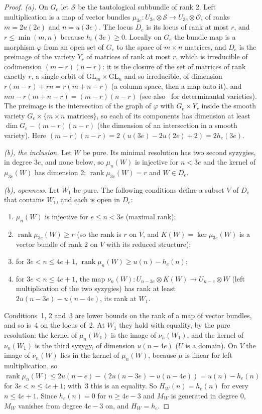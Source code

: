 \documentclass[11pt]{article}
\theoremstyle{definition}
\theoremstyle{remark}
\begin{document}
\begin{proof}
\emph{(a).} On $G_e$ let $\mathcal S$ be the tautological subbundle of rank $2$. Left multiplication is a map of vector bundles $\mu_{3e}:U_{2e}\otimes\mathcal S\to U_{3e}\otimes\mathcal O$, of ranks $m=2u(2e)$ and $n=u(3e)$. The locus $D_e$ is its locus of rank at most $r$, and $r\le\min(m,n)$ because $h_e(3e)\ge0$. Locally on $G_e$ the bundle map is a morphism $\varphi$ from an open set of $G_e$ to the space of $m\times n$ matrices, and $D_e$ is the preimage of the variety $Y_r$ of matrices of rank at most $r$, which is irreducible of codimension $(m-r)(n-r)$: it is the closure of the set of matrices of rank exactly $r$, a single orbit of $\mathrm{GL}_m\times\mathrm{GL}_n$ and so irreducible, of dimension $r(m-r)+rn=r(m+n-r)$ (a column space, then a map onto it), and $mn-r(m+n-r)=(m-r)(n-r)$ (see also~\cite{BV} for determinantal varieties). The preimage is the intersection of the graph of $\varphi$ with $G_e\times Y_r$ inside the smooth variety $G_e\times\{m\times n\text{ matrices}\}$, so each of its components has dimension at least $\dim G_e-(m-r)(n-r)$ (the dimension of an intersection in a smooth variety). Here $(m-r)(n-r)=2\,(u(3e)-2u(2e)+2)=2h_e(3e)$.

\emph{(b), the inclusion.} Let $W$ be pure. Its minimal resolution has two second syzygies, in degree $3e$, and none below, so $\mu_n(W)$ is injective for $n<3e$ and the kernel of $\mu_{3e}(W)$ has dimension $2$: $\operatorname{rank}\mu_{3e}(W)=r$ and $W\in D_e$.

\emph{(b), openness.} Let $W_1$ be pure. The following conditions define a subset $V$ of $D_e$ that contains $W_1$, and each is open in $D_e$:
\begin{enumerate}
\item $\mu_n(W)$ is injective for $e\le n<3e$ (maximal rank);
\item $\operatorname{rank}\mu_{3e}(W)\ge r$ (so the rank is $r$ on $V$, and $K(W)=\ker\mu_{3e}(W)$ is a vector bundle of rank $2$ on $V$ with its reduced structure);
\item for $3e<n\le4e+1$, $\operatorname{rank}\mu_n(W)\ge u(n)-h_e(n)$;
\item for $3e<n\le4e+1$, the map $\nu_n(W):U_{n-3e}\otimes K(W)\to U_{n-e}\otimes W$ (left multiplication of the two syzygies) has rank at least $2u(n-3e)-u(n-4e)$, its rank at $W_1$.
\end{enumerate}
Conditions~1, 2 and~3 are lower bounds on the rank of a map of vector bundles, and so is~4 on the locus of~2. At $W_1$ they hold with equality, by the pure resolution: the kernel of $\mu_n(W_1)$ is the image of $\nu_n(W_1)$, and the kernel of $\nu_n(W_1)$ is the third syzygy, of dimension $u(n-4e)$ ($U$ is a domain). On $V$ the image of $\nu_n(W)$ lies in the kernel of $\mu_n(W)$, because $\mu$ is linear for left multiplication, so $\operatorname{rank}\mu_n(W)\le2u(n-e)-(2u(n-3e)-u(n-4e))=u(n)-h_e(n)$ for $3e<n\le4e+1$; with~3 this is an equality. So $H_W(n)=h_e(n)$ for every $n\le4e+1$. Since $h_e(n)=0$ for $n\ge4e-3$ and $M_W$ is generated in degree $0$, $M_W$ vanishes from degree $4e-3$ on, and $H_W=h_e$.


\end{proof}
\end{document}
